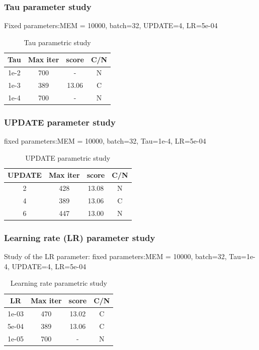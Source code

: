 \documentclass[12pt]{article}
\begin{document}
\subsubsection{Tau parameter study}
Fixed parameters:MEM = 10000, batch=32, UPDATE=4, LR=5e-04

\begin{table}[H]
\centering
\begin{tabular}{|c|c|c|c|}
\hline
{\textbf{Tau}} & {\textbf{Max iter}} & {\textbf{score}} & {\textbf{C/N}} \\ \hline
1e-2 & 700 & -     & N \\ \hline
1e-3 & 389 & 13.06 & C \\ \hline
1e-4 & 700 & -     & N \\ \hline
\end{tabular}
\caption{Tau parametric study}
\label{table:Tau}
\end{table}


\subsubsection{UPDATE parameter study}
fixed parameters:MEM = 10000, batch=32, Tau=1e-4, LR=5e-04

\begin{table}[H]
\centering
\begin{tabular}{|c|c|c|c|}
\hline
{\textbf{UPDATE}} & {\textbf{Max iter}} & {\textbf{score}} & {\textbf{C/N}} \\ \hline
2  & 428 & 13.08 & N \\ \hline
4  & 389 & 13.06 & C \\ \hline
6  & 447 & 13.00 & N \\ \hline
\end{tabular}
\caption{UPDATE parametric study}
\label{table:UPDATE}
\end{table}


\subsubsection{Learning rate (LR) parameter study}
Study of the LR parameter:
fixed parameters:MEM = 10000, batch=32, Tau=1e-4, UPDATE=4, LR=5e-04

\begin{table}[H]
\centering
\begin{tabular}{|c|c|c|c|}
\hline
{\textbf{LR}} & {\textbf{Max iter}} & {\textbf{score}} & {\textbf{C/N}} \\ \hline
1e-03  & 470 & 13.02 & C \\ \hline
5e-04  & 389 & 13.06 & C \\ \hline
1e-05  & 700 &   -   & N \\ \hline
\end{tabular}
\caption{Learning rate parametric study}
\label{table:LR}
\end{table}
\end{document}
